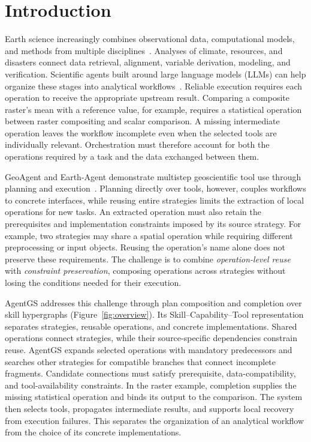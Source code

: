 \section{Introduction}
\label{sec:introduction}
Earth science increasingly combines observational data, computational models, and methods from multiple disciplines~\cite{zheng2025frontiers}. Analyses of climate, resources, and disasters connect data retrieval, alignment, variable derivation, modeling, and verification. Scientific agents built around large language models (LLMs) can help organize these stages into analytical workflows~\cite{feng2026earthagent,ding2025scitoolagent}. Reliable execution requires each operation to receive the appropriate upstream result. Comparing a composite raster's mean with a reference value, for example, requires a statistical operation between raster compositing and scalar comparison. A missing intermediate operation leaves the workflow incomplete even when the selected tools are individually relevant. Orchestration must therefore account for both the operations required by a task and the data exchanged between them.

GeoAgent and Earth-Agent demonstrate multistep geoscientific tool use through planning and execution~\cite{chen2024geoagent,feng2026earthagent}. Planning directly over tools, however, couples workflows to concrete interfaces, while reusing entire strategies limits the extraction of local operations for new tasks. An extracted operation must also retain the prerequisites and implementation constraints imposed by its source strategy. For example, two strategies may share a spatial operation while requiring different preprocessing or input objects. Reusing the operation's name alone does not preserve these requirements. The challenge is to combine \emph{operation-level reuse} with \emph{constraint preservation}, composing operations across strategies without losing the conditions needed for their execution.

AgentGS addresses this challenge through plan composition and completion over skill hypergraphs (Figure~\ref{fig:overview}). Its Skill--Capability--Tool representation separates strategies, reusable operations, and concrete implementations. Shared operations connect strategies, while their source-specific dependencies constrain reuse. AgentGS expands selected operations with mandatory predecessors and searches other strategies for compatible branches that connect incomplete fragments. Candidate connections must satisfy prerequisite, data-compatibility, and tool-availability constraints. In the raster example, completion supplies the missing statistical operation and binds its output to the comparison. The system then selects tools, propagates intermediate results, and supports local recovery from execution failures. This separates the organization of an analytical workflow from the choice of its concrete implementations.

